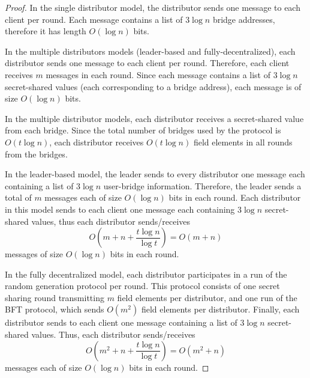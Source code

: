 \documentclass{sig-alternate-05-2015}
\begin{document}
\begin{proof}
	In the single distributor model, the distributor sends one message to each client per round. Each message contains a list of $3\log{n}$ bridge addresses, therefore it has length $O(\log{n})$ bits.
	
	In the multiple distributors models (leader-based and fully-decentralized), each distributor sends one message to each client per round. Therefore, each client receives $m$ messages in each round. Since each message contains a list of $3\log{n}$ secret-shared values (each corresponding to a bridge address), each message is of size $O(\log{n})$ bits.
	
	In the multiple distributor models, each distributor receives a secret-shared value from each bridge. Since the total number of bridges used by the protocol is $O(t\log{n})$, each distributor receives $O(t\log{n})$ field elements in all rounds from the bridges.	
	
	In the leader-based model, the leader sends to every distributor one message each containing a list of $3\log{n}$ user-bridge information. Therefore, the leader sends a total of $m$ messages each of size $O(\log{n})$ bits in each round. Each distributor in this model sends to each client one message each containing $3\log{n}$ secret-shared values, thus each distributor sends/receives \[O\left(m + n + \frac{t\log{n}}{\log{t}}\right) = O(m + n)\] messages of size $O(\log{n})$ bits in each round.
	
	In the fully decentralized model, each distributor participates in a run of the random generation protocol per round. This protocol consists of one secret sharing round transmitting $m$ field elements per distributor, and one run of the BFT protocol, which sends $O(m^2)$ field elements per distributor. Finally, each distributor sends to each client one message containing a list of $3\log{n}$ secret-shared values. Thus, each distributor sends/receives \[O\left(m^2 + n + \frac{t\log{n}}{\log{t}}\right) = O(m^2 + n)\] messages each of size $O(\log{n})$ bits in each round.
	
\end{proof}
\end{document}
